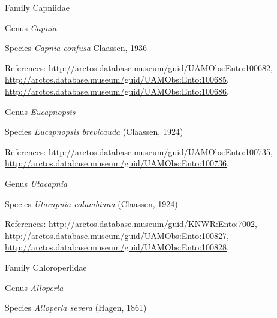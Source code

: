 \documentclass[9pt, article]{memoir}
\begin{document}
\begin{multicols}{2}
\vspace{6pt}\noindent\hspace{24pt}Family Capniidae


\vspace{6pt}\noindent\hspace{30pt}Genus \textit{Capnia}


\vspace{6pt}\noindent\hspace{36pt}Species \textit{Capnia confusa} Claassen, 1936


\vspace{6pt}References: 
\url{http://arctos.database.museum/guid/UAMObs:Ento:100682}, 
\url{http://arctos.database.museum/guid/UAMObs:Ento:100685}, 
\url{http://arctos.database.museum/guid/UAMObs:Ento:100686}.

\vspace{6pt}\noindent\hspace{30pt}Genus \textit{Eucapnopsis}


\vspace{6pt}\noindent\hspace{36pt}Species \textit{Eucapnopsis brevicauda} (Claassen, 1924)


\vspace{6pt}References: 
\url{http://arctos.database.museum/guid/UAMObs:Ento:100735}, 
\url{http://arctos.database.museum/guid/UAMObs:Ento:100736}.

\vspace{6pt}\noindent\hspace{30pt}Genus \textit{Utacapnia}


\vspace{6pt}\noindent\hspace{36pt}Species \textit{Utacapnia columbiana} (Claassen, 1924)


\vspace{6pt}References: 
\url{http://arctos.database.museum/guid/KNWR:Ento:7002}, 
\url{http://arctos.database.museum/guid/UAMObs:Ento:100827}, 
\url{http://arctos.database.museum/guid/UAMObs:Ento:100828}.

\vspace{6pt}\noindent\hspace{24pt}Family Chloroperlidae


\vspace{6pt}\noindent\hspace{30pt}Genus \textit{Alloperla}


\vspace{6pt}\noindent\hspace{36pt}Species \textit{Alloperla severa} (Hagen, 1861)



\end{multicols}
\end{document}
